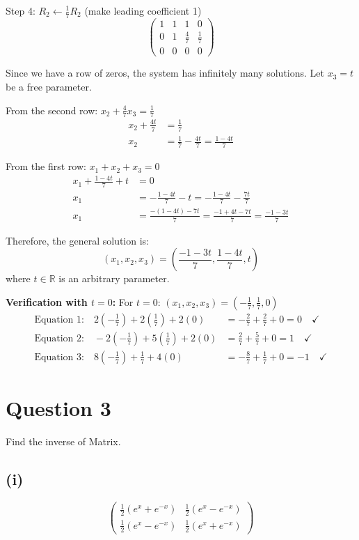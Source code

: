 \documentclass[12pt]{article}
\begin{document}
Step 4: $R_2 \leftarrow \frac{1}{7}R_2$ (make leading coefficient 1)
\[
\left(\begin{array}{ccc|c}
1 & 1 & 1 & 0\\
0 & 1 & \frac{4}{7} & \frac{1}{7}\\
0 & 0 & 0 & 0
\end{array}\right)
\]

Since we have a row of zeros, the system has infinitely many solutions. Let $x_3 = t$ be a free parameter.

From the second row: $x_2 + \frac{4}{7}x_3 = \frac{1}{7}$
\begin{align*}
x_2 + \frac{4t}{7} &= \frac{1}{7}\\
x_2 &= \frac{1}{7} - \frac{4t}{7} = \frac{1-4t}{7}
\end{align*}

From the first row: $x_1 + x_2 + x_3 = 0$
\begin{align*}
x_1 + \frac{1-4t}{7} + t &= 0\\
x_1 &= -\frac{1-4t}{7} - t = -\frac{1-4t}{7} - \frac{7t}{7}\\
x_1 &= \frac{-(1-4t) - 7t}{7} = \frac{-1+4t-7t}{7} = \frac{-1-3t}{7}
\end{align*}

Therefore, the general solution is:
\[
\boxed{(x_1, x_2, x_3) = \left(\frac{-1-3t}{7}, \frac{1-4t}{7}, t\right)}
\]
where $t \in \mathbb{R}$ is an arbitrary parameter.

\textbf{Verification with $t = 0$:}
For $t = 0$: $(x_1, x_2, x_3) = \left(-\frac{1}{7}, \frac{1}{7}, 0\right)$
\begin{align*}
\text{Equation 1:} \quad 2\left(-\frac{1}{7}\right) + 2\left(\frac{1}{7}\right) + 2(0) &= -\frac{2}{7} + \frac{2}{7} + 0 = 0 \quad \checkmark\\
\text{Equation 2:} \quad -2\left(-\frac{1}{7}\right) + 5\left(\frac{1}{7}\right) + 2(0) &= \frac{2}{7} + \frac{5}{7} + 0 = 1 \quad \checkmark\\
\text{Equation 3:} \quad 8\left(-\frac{1}{7}\right) + \frac{1}{7} + 4(0) &= -\frac{8}{7} + \frac{1}{7} + 0 = -1 \quad \checkmark
\end{align*}

\section*{Question 3}
Find the inverse of Matrix.

\subsection*{(i)}
\[
\begin{pmatrix}
\frac{1}{2}(e^x + e^{-x}) & \frac{1}{2}(e^x - e^{-x})\\
\frac{1}{2}(e^x - e^{-x}) & \frac{1}{2}(e^x + e^{-x})
\end{pmatrix}
\]
\end{document}
